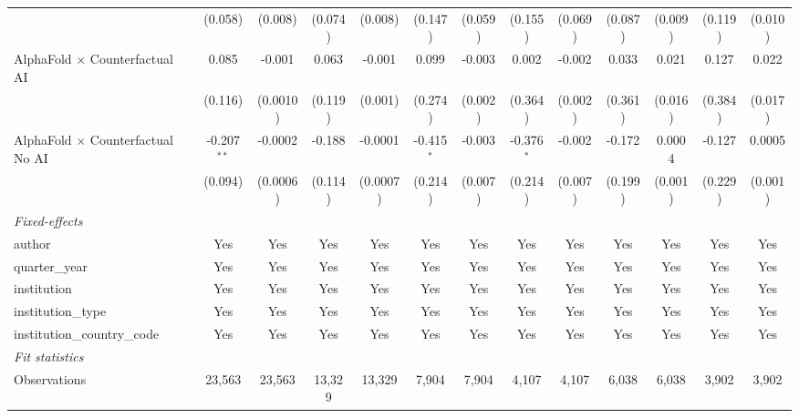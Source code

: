 \begin{tabular}{lcccccccccccc}
                                            & (0.058)       & (0.008)      & (0.074) & (0.008)      & (0.147)      & (0.059) & (0.155)      & (0.069) & (0.087) & (0.009)       & (0.119) & (0.010)\\   
   AlphaFold $\times$ Counterfactual AI     & 0.085         & -0.001       & 0.063   & -0.001       & 0.099        & -0.003  & 0.002        & -0.002  & 0.033   & 0.021         & 0.127   & 0.022\\   
                                            & (0.116)       & (0.0010)     & (0.119) & (0.001)      & (0.274)      & (0.002) & (0.364)      & (0.002) & (0.361) & (0.016)       & (0.384) & (0.017)\\   
   AlphaFold $\times$ Counterfactual No AI  & -0.207$^{**}$ & -0.0002      & -0.188  & -0.0001      & -0.415$^{*}$ & -0.003  & -0.376$^{*}$ & -0.002  & -0.172  & 0.0004        & -0.127  & 0.0005\\   
                                            & (0.094)       & (0.0006)     & (0.114) & (0.0007)     & (0.214)      & (0.007) & (0.214)      & (0.007) & (0.199) & (0.001)       & (0.229) & (0.001)\\   
   \midrule
   \emph{Fixed-effects}\\
   author                                   & Yes           & Yes          & Yes     & Yes          & Yes          & Yes     & Yes          & Yes     & Yes     & Yes           & Yes     & Yes\\  
   quarter\_year                            & Yes           & Yes          & Yes     & Yes          & Yes          & Yes     & Yes          & Yes     & Yes     & Yes           & Yes     & Yes\\  
   institution                              & Yes           & Yes          & Yes     & Yes          & Yes          & Yes     & Yes          & Yes     & Yes     & Yes           & Yes     & Yes\\  
   institution\_type                        & Yes           & Yes          & Yes     & Yes          & Yes          & Yes     & Yes          & Yes     & Yes     & Yes           & Yes     & Yes\\  
   institution\_country\_code               & Yes           & Yes          & Yes     & Yes          & Yes          & Yes     & Yes          & Yes     & Yes     & Yes           & Yes     & Yes\\  
   \midrule
   \emph{Fit statistics}\\
   Observations                             & 23,563        & 23,563       & 13,329  & 13,329       & 7,904        & 7,904   & 4,107        & 4,107   & 6,038   & 6,038         & 3,902   & 3,902\\  

\end{tabular}
